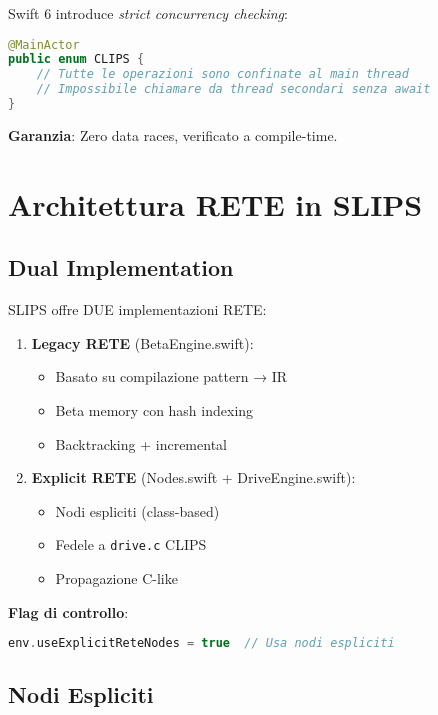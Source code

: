 Swift 6 introduce \textit{strict concurrency checking}:

\begin{lstlisting}[language=Swift]
@MainActor
public enum CLIPS {
    // Tutte le operazioni sono confinate al main thread
    // Impossibile chiamare da thread secondari senza await
}
\end{lstlisting}

\textbf{Garanzia}: Zero data races, verificato a compile-time.

\section{Architettura RETE in SLIPS}

\subsection{Dual Implementation}

SLIPS offre DUE implementazioni RETE:

\begin{enumerate}
\item \textbf{Legacy RETE} (BetaEngine.swift):
   \begin{itemize}
   \item Basato su compilazione pattern → IR
   \item Beta memory con hash indexing
   \item Backtracking + incremental
   \end{itemize}

\item \textbf{Explicit RETE} (Nodes.swift + DriveEngine.swift):
   \begin{itemize}
   \item Nodi espliciti (class-based)
   \item Fedele a \texttt{drive.c} CLIPS
   \item Propagazione C-like
   \end{itemize}
\end{enumerate}

\textbf{Flag di controllo}:
\begin{lstlisting}[language=Swift]
env.useExplicitReteNodes = true  // Usa nodi espliciti
\end{lstlisting}

\subsection{Nodi Espliciti}

